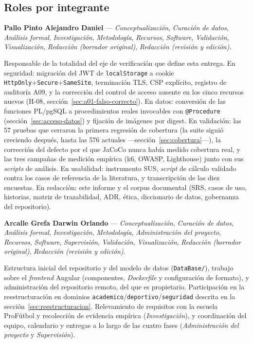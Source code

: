 \documentclass[11pt,a4paper]{article}
\begin{document}
\subsection{Roles por integrante}

\textbf{Pallo Pinto Alejandro Daniel} — \emph{Conceptualización},
\emph{Curación de datos}, \emph{Análisis formal}, \emph{Investigación},
\emph{Metodología}, \emph{Recursos}, \emph{Software}, \emph{Validación},
\emph{Visualización}, \emph{Redacción (borrador original)}, \emph{Redacción
(revisión y edición)}.

Responsable de la totalidad del eje de verificación que define esta
entrega. En seguridad: migración del JWT de \texttt{localStorage} a cookie
\texttt{HttpOnly}+\texttt{Secure}+\texttt{SameSite}, terminación TLS,
CSP explícito, registro de auditoría A09, y la corrección del control de
acceso ausente en los cinco recursos nuevos (H-08,
sección~\ref{sec:a01-falso-correcto}). En datos: conversión de las
funciones PL/pgSQL a procedimientos reales invocables con
\texttt{@Procedure} (sección~\ref{sec:acceso-datos}) y fijación de
imágenes por digest. En validación: las 57 pruebas que cerraron la
primera regresión de cobertura (la suite siguió creciendo después, hasta
las 576 actuales —sección~\ref{sec:cobertura}—), la corrección del defecto
por el que JaCoCo nunca había medido cobertura real, y las tres campañas
de medición empírica (k6, OWASP, Lighthouse) junto con sus \emph{scripts}
de análisis. En usabilidad: instrumento SUS, \emph{script} de cálculo
validado contra los casos de referencia de la literatura, y transcripción
de las diez encuestas. En redacción: este informe y el corpus documental
(SRS, casos de uso, historias, matriz de trazabilidad, ADR, ética,
diccionario de datos, gobernanza del repositorio).

\textbf{Arcalle Grefa Darwin Orlando} — \emph{Conceptualización},
\emph{Curación de datos}, \emph{Análisis formal}, \emph{Investigación},
\emph{Metodología}, \emph{Administración del proyecto}, \emph{Recursos},
\emph{Software}, \emph{Supervisión}, \emph{Validación},
\emph{Visualización}, \emph{Redacción (borrador original)}, \emph{Redacción
(revisión y edición)}.

Estructura inicial del repositorio y del modelo de datos
(\texttt{DataBase/}), trabajo sobre el \emph{frontend} Angular
(componentes, \emph{Dockerfile} y configuración de formato), y
administración del repositorio remoto, del que es propietario.
Participación en la reestructuración en dominios
\texttt{academico}/\texttt{deportivo}/\texttt{seguridad} descrita en la
sección~\ref{sec:reestructuracion}. Relevamiento de requisitos con la
escuela ProFútbol y recolección de evidencia empírica (\emph{Investigación}),
y coordinación del equipo, calendario y entregas a lo largo de las cuatro
fases (\emph{Administración del proyecto} y \emph{Supervisión}).
\end{document}
